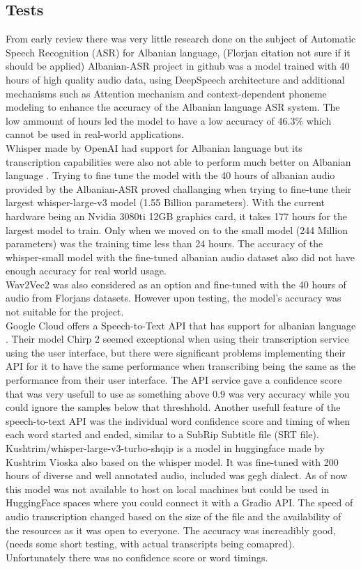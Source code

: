 \documentclass[12pt]{article}
\begin{document}
\subsection{Tests}
From early review there was very little research done on the subject of Automatic Speech Recognition (ASR) for Albanian language, (Florjan citation not sure if it should be applied) Albanian-ASR project in github was a model trained with 40 hours of high quality audio data, using DeepSpeech architecture and additional mechanisms such as Attention mechanism and context-dependent phoneme modeling to enhance the accuracy of the Albanian language ASR system. The low ammount of hours led the model to have a low accuracy of 46.3\% which cannot be used in real-world applications.\\
Whisper made by OpenAI had support for Albanian language but its transcription capabilities were also not able to perform much better on Albanian language \cite{openai_whisper}. Trying to fine tune the model with the 40 hours of albanian audio provided by the Albanian-ASR proved challanging when trying to fine-tune their largest whisper-large-v3 model (1.55 Billion parameters). With the current hardware being an Nvidia 3080ti 12GB graphics card, it takes 177 hours for the largest model to train. Only when we moved on to the small model (244 Million parameters) was the training time less than 24 hours. The accuracy of the whisper-small model with the fine-tuned albanian audio dataset also did not have enough accuracy for real world usage.\\
Wav2Vec2 was also considered as an option and fine-tuned with the 40 hours of audio from Florjans datasets. However upon testing, the model's accuracy was not suitable for the project. \\
Google Cloud offers a Speech-to-Text API that has support for albanian language \cite{google_api_docs}. Their model Chirp 2 seemed exceptional when using their transcription service using the user interface, but there were significant problems implementing their API for it to have the same performance when transcribing being the same as the performance from their user interface. The API service gave a confidence score that was very usefull to use as something above 0.9 was very accuracy while you could ignore the samples below that threshhold. Another usefull feature of the speech-to-text API was the individual word confidence score and timing of when each word started and ended, similar to a SubRip Subtitle file (SRT file).\\
Kushtrim/whisper-large-v3-turbo-shqip is a model in huggingface made by Kushtrim Vioska also based on the whisper model. It was fine-tuned with 200 hours of diverse and well annotated audio, included was gegh dialect. As of now this model was not available to host on local machines but could be used in HuggingFace spaces where you could connect it with a  Gradio API. The speed of audio transcription changed based on the size of the file and the availability of the resources as it was open to everyone. The accuracy was increadibly good, (needs some short testing, with actual transcripts being comapred). Unfortunately there was no confidence score or word timings.\\
\end{document}

